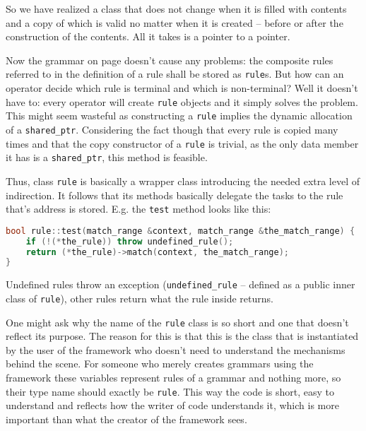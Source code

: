 \documentclass[12pt]{article}
\begin{document}
So we have realized a class that does not change when it is filled with contents and a copy of which is valid
no matter when it is created -- before or after the construction of the contents. All it takes is a pointer to
a pointer.

Now the grammar on page \pageref{lst:numberedexpressiongrammar} doesn't cause any problems: the composite
rules referred to in the definition of a rule shall be stored as \texttt{rule}s. But how can an operator
decide which rule is terminal and which is non-terminal? Well it doesn't have to: every operator will create
\texttt{rule} objects and it simply solves the problem. This might seem wasteful as constructing a
\texttt{rule} implies the dynamic allocation of a \texttt{shared\_ptr}. Considering the fact though that every
rule is copied many times and that the copy constructor of a \texttt{rule} is trivial, as the only data member
it has is a \texttt{shared\_ptr}, this method is feasible.

Thus, class \texttt{rule} is basically a wrapper class introducing the needed extra level of indirection. It
follows that its methods basically delegate the tasks to the rule that's address is stored. E.g. the
\texttt{test} method looks like this:

\begin{center}
	\begin{minipage}[h]{0.8\textwidth}
		\begin{lstlisting}[language=C++, breaklines=true]
bool rule::test(match_range &context, match_range &the_match_range) {
	if (!(*the_rule)) throw undefined_rule();
	return (*the_rule)->match(context, the_match_range);
}
		\end{lstlisting}
	\end{minipage}
\end{center}

Undefined rules throw an exception (\texttt{undefined\_rule} -- defined as a public inner class of
\texttt{rule}), other rules return what the rule inside returns.

\vspace{0.8em}
One might ask why the name of the \texttt{rule} class is so short and one that doesn't reflect its purpose.
The reason for this is that this is the class that is instantiated by the user of the framework who doesn't
need to understand the mechanisms behind the scene. For someone who merely creates grammars using the
framework these variables represent rules of a grammar and nothing more, so their type name should exactly be
\texttt{rule}. This way the code is short, easy to understand and reflects how the writer of code understands
it, which is more important than what the creator of the framework sees.
\end{document}
